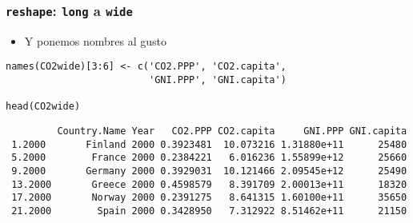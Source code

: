 \documentclass[xcolor={usenames,svgnames,dvipsnames}]{beamer}
\begin{document}
\begin{frame}[fragile]
\frametitle{\texttt{reshape}: \texttt{long} a \texttt{wide}}
\label{sec-4-7}

\begin{itemize}
\item Y ponemos nombres al gusto
\end{itemize}

\lstset{language=R}
\begin{lstlisting}
names(CO2wide)[3:6] <- c('CO2.PPP', 'CO2.capita',
                         'GNI.PPP', 'GNI.capita')

head(CO2wide)
\end{lstlisting}

\begin{verbatim}
         Country.Name Year   CO2.PPP CO2.capita     GNI.PPP GNI.capita
 1.2000       Finland 2000 0.3923481  10.073216 1.31880e+11      25480
 5.2000        France 2000 0.2384221   6.016236 1.55899e+12      25660
 9.2000       Germany 2000 0.3929031  10.121466 2.09545e+12      25490
 13.2000       Greece 2000 0.4598579   8.391709 2.00013e+11      18320
 17.2000       Norway 2000 0.2391275   8.641315 1.60100e+11      35650
 21.2000        Spain 2000 0.3428950   7.312922 8.51462e+11      21150
\end{verbatim}

  
  
  
  
  
  
  
\end{frame}
\end{document}
